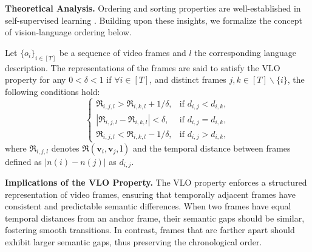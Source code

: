 \noindent\textbf{Theoretical Analysis.}  Ordering and sorting properties are well-established in self-supervised learning \cite{DBLP:conf/iccv/ShvetsovaPKSK23,DBLP:conf/iccv/HuSLRSS21,nips23-rnc}. Building upon these insights, we formalize the concept of vision-language ordering below.
\begin{definition}
\label{def:delta-ordered}
Let $\{o_i\}_{i\in[T]}$ be a sequence of video frames and $l$ the corresponding language description. The representations of the frames are said to satisfy the VLO property for any $0<\delta<1$ if $\forall i \in[T]$, and distinct frames $j, k \in[T] \backslash\{i\}$, the following conditions hold:
\[
\left\{
\begin{array}{ll}
\mathfrak{R}_{i,j,l} > \mathfrak{R}_{i,k,l} + 1/{\delta}, & \text{if } d_{i,j} < d_{i,k}, \\
\left|\mathfrak{R}_{i,j,l} - \mathfrak{R}_{i,k,l}\right| < \delta, & \text{if } d_{i,j} = d_{i,k}, \\
\mathfrak{R}_{i,j,l} < \mathfrak{R}_{i,k,l} - 1/{\delta}, & \text{if } d_{i,j} > d_{i,k},
\end{array}
\right.
\]
where $\mathfrak{R}_{i,j,l}$ denotes  $\mathfrak{R}\left(\mathbf{v}_i,\mathbf{v}_j,\mathbf{l}\right)$ and the temporal distance between frames defined as $|n(i) - n(j)|$ as $d_{i,j}$. 
\end{definition}
\textbf{Implications of the VLO Property.} The VLO property enforces a structured representation of video frames, ensuring that temporally adjacent frames have consistent and predictable semantic differences. When two frames have equal temporal distances from an anchor frame, their semantic gaps should be similar, fostering smooth transitions. In contrast, frames that are farther apart should exhibit larger semantic gaps, thus preserving the chronological order.



